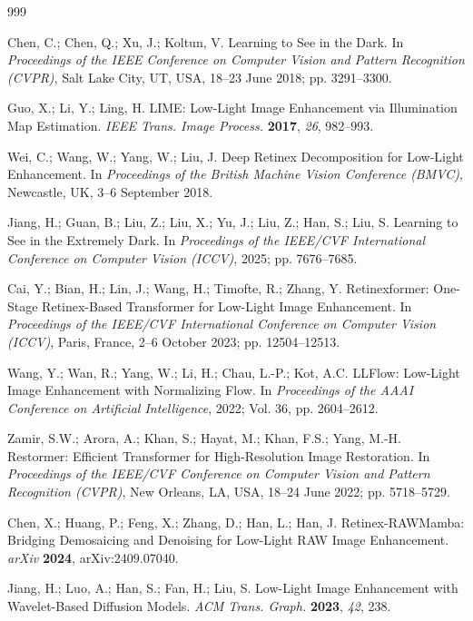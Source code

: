 \documentclass[remotesensing,article,accept,moreauthors]{Definitions/mdpi}
\begin{document}
\begin{thebibliography}{999}

Chen, C.; Chen, Q.; Xu, J.; Koltun, V. Learning to See in the Dark. In \emph{Proceedings of the IEEE Conference on Computer Vision and Pattern Recognition (CVPR)}, Salt Lake City, UT, USA, 18--23 June 2018; pp. 3291--3300.

Guo, X.; Li, Y.; Ling, H. LIME: Low-Light Image Enhancement via Illumination Map Estimation. \emph{IEEE Trans. Image Process.} {\bf 2017}, \emph{26}, 982--993.

Wei, C.; Wang, W.; Yang, W.; Liu, J. Deep Retinex Decomposition for Low-Light Enhancement. In \emph{Proceedings of the British Machine Vision Conference (BMVC)}, Newcastle, UK, 3--6 September 2018.

Jiang, H.; Guan, B.; Liu, Z.; Liu, X.; Yu, J.; Liu, Z.; Han, S.; Liu, S. Learning to See in the Extremely Dark. In \emph{Proceedings of the IEEE/CVF International Conference on Computer Vision (ICCV)}, 2025; pp. 7676--7685.

Cai, Y.; Bian, H.; Lin, J.; Wang, H.; Timofte, R.; Zhang, Y. Retinexformer: One-Stage Retinex-Based Transformer for Low-Light Image Enhancement. In \emph{Proceedings of the IEEE/CVF International Conference on Computer Vision (ICCV)}, Paris, France, 2--6 October 2023; pp. 12504--12513.

Wang, Y.; Wan, R.; Yang, W.; Li, H.; Chau, L.-P.; Kot, A.C. LLFlow: Low-Light Image Enhancement with Normalizing Flow. In \emph{Proceedings of the AAAI Conference on Artificial Intelligence}, 2022; Vol. 36, pp. 2604--2612.

Zamir, S.W.; Arora, A.; Khan, S.; Hayat, M.; Khan, F.S.; Yang, M.-H. Restormer: Efficient Transformer for High-Resolution Image Restoration. In \emph{Proceedings of the IEEE/CVF Conference on Computer Vision and Pattern Recognition (CVPR)}, New Orleans, LA, USA, 18--24 June 2022; pp. 5718--5729.

Chen, X.; Huang, P.; Feng, X.; Zhang, D.; Han, L.; Han, J. Retinex-RAWMamba: Bridging Demosaicing and Denoising for Low-Light RAW Image Enhancement. \emph{arXiv} {\bf 2024}, arXiv:2409.07040.

Jiang, H.; Luo, A.; Han, S.; Fan, H.; Liu, S. Low-Light Image Enhancement with Wavelet-Based Diffusion Models. \emph{ACM Trans. Graph.} {\bf 2023}, \emph{42}, 238.


\end{thebibliography}
\end{document}

